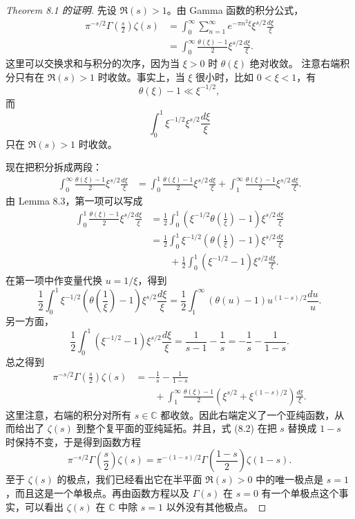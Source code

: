 \begin{proof}[Theorem 8.1 的证明]
	先设 $\Re(s)>1$。由 Gamma 函数的积分公式，
	\[
	\begin{aligned}
		\pi^{-s/2}\Gamma\left(\frac{s}{2}\right)\zeta(s)
		&=
		\int_0^\infty
		\sum_{n=1}^{\infty}e^{-\pi n^2\xi}
		\xi^{s/2}\frac{d\xi}{\xi} \\
		&=
		\int_0^\infty
		\frac{\theta(\xi)-1}{2}
		\xi^{s/2}\frac{d\xi}{\xi}.
	\end{aligned}
	\]
	这里可以交换求和与积分的次序，因为当 $\xi>0$ 时 $\theta(\xi)$ 绝对收敛。
	注意右端积分只有在 $\Re(s)>1$ 时收敛。事实上，当 $\xi$ 很小时，比如
	$0<\xi<1$，有
	\[
		\theta(\xi)-1\ll \xi^{-1/2},
	\]
	而
	\[
		\int_0^1 \xi^{-1/2}\xi^{s/2}\frac{d\xi}{\xi}
	\]
	只在 $\Re(s)>1$ 时收敛。

	现在把积分拆成两段：
	\[
	\begin{aligned}
		\int_0^\infty
		\frac{\theta(\xi)-1}{2}
		\xi^{s/2}\frac{d\xi}{\xi}
		&=
		\int_0^1
		\frac{\theta(\xi)-1}{2}
		\xi^{s/2}\frac{d\xi}{\xi}
		+
		\int_1^\infty
		\frac{\theta(\xi)-1}{2}
		\xi^{s/2}\frac{d\xi}{\xi}.
	\end{aligned}
	\]
	由 Lemma 8.3，第一项可以写成
	\[
	\begin{aligned}
		\int_0^1
		\frac{\theta(\xi)-1}{2}
		\xi^{s/2}\frac{d\xi}{\xi}
		&=
		\frac12
		\int_0^1
		\left(\xi^{-1/2}\theta\left(\frac1\xi\right)-1\right)
		\xi^{s/2}\frac{d\xi}{\xi} \\
		&=
		\frac12
		\int_0^1
		\xi^{-1/2}
		\left(\theta\left(\frac1\xi\right)-1\right)
		\xi^{s/2}\frac{d\xi}{\xi} \\
		&\qquad
		+
		\frac12
		\int_0^1
		(\xi^{-1/2}-1)\xi^{s/2}\frac{d\xi}{\xi}.
	\end{aligned}
	\]
	在第一项中作变量代换 $u=1/\xi$，得到
	\[
		\frac12
		\int_0^1
		\xi^{-1/2}
		\left(\theta\left(\frac1\xi\right)-1\right)
		\xi^{s/2}\frac{d\xi}{\xi}
		=
		\frac12
		\int_1^\infty
		(\theta(u)-1)u^{(1-s)/2}\frac{du}{u}.
	\]
	另一方面，
	\[
		\frac12
		\int_0^1
		(\xi^{-1/2}-1)\xi^{s/2}\frac{d\xi}{\xi}
		=
		\frac{1}{s-1}-\frac1s
		=
		-\frac1s-\frac{1}{1-s}.
	\]
	总之得到
	\begin{equation}
	\begin{aligned}
		\pi^{-s/2}\Gamma\left(\frac{s}{2}\right)\zeta(s)
		&=
		-\frac1s-\frac{1}{1-s} \\
		&\qquad
		+
		\int_1^\infty
		\frac{\theta(\xi)-1}{2}
		\left(\xi^{s/2}+\xi^{(1-s)/2}\right)
		\frac{d\xi}{\xi}.
	\end{aligned}
	\tag{8.2}
	\end{equation}
	这里注意，右端的积分对所有 $s\in\mathbb C$ 都收敛。因此右端定义了一个亚纯函数，从而给出了 $\zeta(s)$ 到整个复平面的亚纯延拓。并且，式 (8.2) 在把 $s$ 替换成 $1-s$ 时保持不变，于是得到函数方程
	\[
		\pi^{-s/2}\Gamma\left(\frac{s}{2}\right)\zeta(s)
		=
		\pi^{-(1-s)/2}
		\Gamma\left(\frac{1-s}{2}\right)\zeta(1-s).
	\]
	至于 $\zeta(s)$ 的极点，我们已经看出它在半平面 $\Re(s)>0$ 中的唯一极点是 $s=1$，而且这是一个单极点。再由函数方程以及 $\Gamma(s)$ 在 $s=0$ 有一个单极点这个事实，可以看出 $\zeta(s)$ 在 $\mathbb C$ 中除 $s=1$ 以外没有其他极点。
\end{proof}

